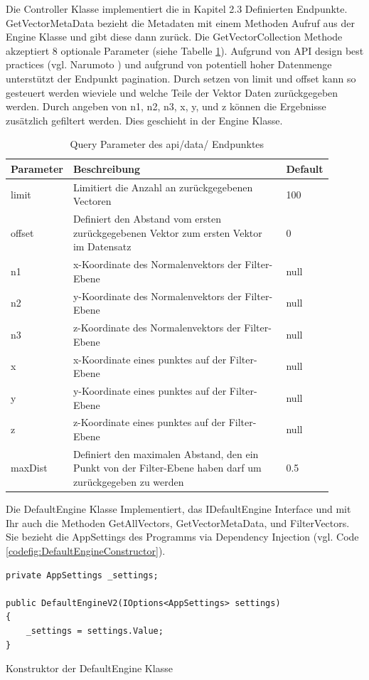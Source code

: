 Die Controller Klasse implementiert die in Kapitel 2.3 Definierten Endpunkte. GetVectorMetaData bezieht die Metadaten mit einem Methoden Aufruf aus der Engine Klasse und gibt diese dann zurück.
Die GetVectorCollection Methode akzeptiert 8 optionale Parameter (siehe Tabelle \ref{tab:EndpointQueryParameters}). Aufgrund von API design best practices (vgl. Narumoto \cite{ApiDesignBestPractices}) und aufgrund von potentiell hoher Datenmenge unterstützt der Endpunkt pagination. Durch setzen von limit und offset kann so gesteuert werden wieviele und welche Teile der Vektor Daten zurückgegeben werden. Durch angeben von n1, n2, n3, x, y, und z können die Ergebnisse zusätzlich gefiltert werden. Dies geschieht in der Engine Klasse.
\begin{table}
	\centering
	\begin{tabular}[h]{p{0.11\linewidth} | p{0.7\linewidth}| p{0.09\linewidth}}
	Parameter & Beschreibung & Default \\
	\hline
	limit & Limitiert die Anzahl an zurückgegebenen Vectoren & 100\\
	offset & Definiert den Abstand vom ersten zurückgegebenen Vektor zum ersten Vektor im Datensatz & 0\\
	n1 & x-Koordinate des Normalenvektors der Filter-Ebene & null\\
	n2 & y-Koordinate des Normalenvektors der Filter-Ebene & null\\
	n3 & z-Koordinate des Normalenvektors der Filter-Ebene & null\\
	x & x-Koordinate eines punktes auf der Filter-Ebene & null\\
	y & y-Koordinate eines punktes auf der Filter-Ebene & null\\
	z & z-Koordinate eines punktes auf der Filter-Ebene & null\\
	maxDist & Definiert den maximalen Abstand, den ein Punkt von der Filter-Ebene haben darf um zurückgegeben zu werden & 0.5\\
	\end{tabular}
	\caption{Query Parameter des api/data/ Endpunktes}
	\label{tab:EndpointQueryParameters}
\end{table}
Die DefaultEngine Klasse Implementiert, das IDefaultEngine Interface und mit Ihr auch die Methoden GetAllVectors, GetVectorMetaData, und FilterVectors. Sie bezieht die AppSettings des Programms via Dependency Injection (vgl. Code \ref{codefig:DefaultEngineConstructor}).
\begin{codefig}
	\centering
	\lstset{style=sharpc}
	\begin{lstlisting}
private AppSettings _settings;

public DefaultEngineV2(IOptions<AppSettings> settings)
{
	_settings = settings.Value;
}
	\end{lstlisting}
	\caption{Konstruktor der DefaultEngine Klasse}
	\label{codefig:DefaultEngineConstructor}
\end{codefig}
